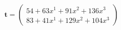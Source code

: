 \documentclass[preview]{standalone}
\begin{document}
\begin{align*}
\mathbf{t} = \begin{pmatrix}54 + 63x^{1} + 91x^{2} + 136x^{3} \\ 83 + 41x^{1} + 129x^{2} + 104x^{3}\end{pmatrix}
\end{align*}
\end{document}
